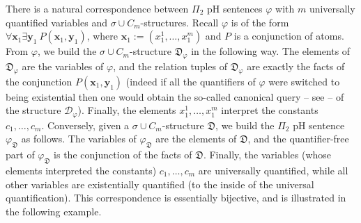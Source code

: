 \documentclass{LMCS}
\newcommand{\tuple}[1]{\ensuremath{\mathbf{#1}}}
\begin{document}
There is a natural correspondence between $\Pi_2$ pH sentences $\varphi$ with $m$ universally quantified variables and
$\sigma \cup C_m$-structures. Recall $\varphi$ is of the form $\forall \tuple{x}_1 \exists \tuple{y}_1 \ P(\tuple{x}_1,\tuple{y}_1)$, where $\tuple{x}_1:=(x^1_1,\ldots,x^m_1)$ and $P$ is a conjunction of atoms.
From $\varphi$, we build the $\sigma \cup C_m$-structure $\mathfrak{D}_\varphi$ in the following way. The elements of $\mathfrak{D}_\varphi$ are the variables of $\varphi$, and the relation tuples of $\mathfrak{D}_\varphi$ are exactly the facts of the conjunction $P(\tuple{x}_1,\tuple{y}_1)$ (indeed if all the quantifiers of $\varphi$ were switched to being existential then one would obtain the so-called canonical query -- see \cite{KolaitisVardiBook05} -- of the structure $\mathcal{D}_\varphi$). Finally, the elements $x^1_1,\ldots,x^m_1$ interpret the constants $c_1,\ldots,c_m$. 
Conversely, given a $\sigma \cup C_m$-structure
$\mathfrak{D}$, we build the $\Pi_2$ pH sentence $\varphi_\mathfrak{D}$ as follows. The variables of $\varphi_\mathfrak{D}$ are the elements of $\mathfrak{D}$, and the quantifier-free part of $\varphi_\mathfrak{D}$ is the conjunction of the facts of $\mathfrak{D}$. Finally, the variables (whose elements interpreted the constants) $c_1,\ldots,c_m$ are universally quantified, while all other variables are existentially quantified (to the inside of the universal quantification).  This correspondence is essentially bijective, and is illustrated in the following example. 
\end{document}
